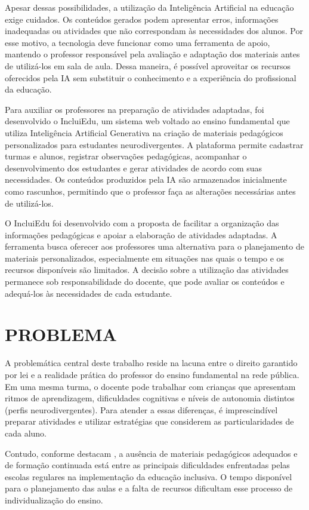 Apesar dessas possibilidades, a utilização da Inteligência Artificial na educação exige cuidados. Os conteúdos gerados podem apresentar erros, informações inadequadas ou atividades que não correspondam às necessidades dos alunos. Por esse motivo, a tecnologia deve funcionar como uma ferramenta de apoio, mantendo o professor responsável pela avaliação e adaptação dos materiais antes de utilizá-los em sala de aula. Dessa maneira, é possível aproveitar os recursos oferecidos pela IA sem substituir o conhecimento e a experiência do profissional da educação.

Para auxiliar os professores na preparação de atividades adaptadas, foi desenvolvido o IncluiEdu, um sistema web voltado ao ensino fundamental que utiliza Inteligência Artificial Generativa na criação de materiais pedagógicos personalizados para estudantes neurodivergentes. A plataforma permite cadastrar turmas e alunos, registrar observações pedagógicas, acompanhar o desenvolvimento dos estudantes e gerar atividades de acordo com suas necessidades. Os conteúdos produzidos pela IA são armazenados inicialmente como rascunhos, permitindo que o professor faça as alterações necessárias antes de utilizá-los.

O IncluiEdu foi desenvolvido com a proposta de facilitar a organização das informações pedagógicas e apoiar a elaboração de atividades adaptadas. A ferramenta busca oferecer aos professores uma alternativa para o planejamento de materiais personalizados, especialmente em situações nas quais o tempo e os recursos disponíveis são limitados. A decisão sobre a utilização das atividades permanece sob responsabilidade do docente, que pode avaliar os conteúdos e adequá-los às necessidades de cada estudante.

\section{PROBLEMA}

A problemática central deste trabalho reside na lacuna entre o direito garantido por lei e a realidade prática do professor do ensino fundamental na rede pública. Em uma mesma turma, o docente pode trabalhar com crianças que apresentam ritmos de aprendizagem, dificuldades cognitivas e níveis de autonomia distintos (perfis neurodivergentes). Para atender a essas diferenças, é imprescindível preparar atividades e utilizar estratégias que considerem as particularidades de cada aluno.

Contudo, conforme destacam , a ausência de materiais pedagógicos adequados e de formação continuada está entre as principais dificuldades enfrentadas pelas escolas regulares na implementação da educação inclusiva. O tempo disponível para o planejamento das aulas e a falta de recursos dificultam esse processo de individualização do ensino.

